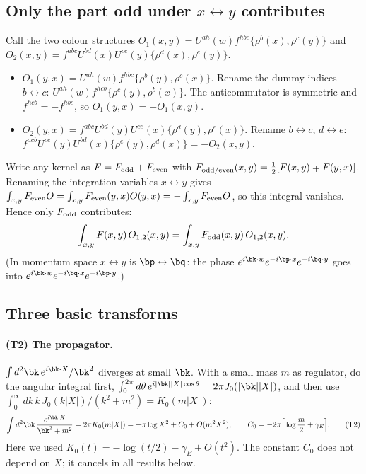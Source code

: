 \subsection{Only the part odd under \texorpdfstring{$x\leftrightarrow y$}{x<->y} contributes}\label{sec:ft-odd}
Call the two colour structures $O_1(x,y)=U^{ah}(w)f^{hbc}\{\rho^b(x),\rho^c(y)\}$ and $O_2(x,y)=f^{abc}U^{bd}(x)U^{ce}(y)\{\rho^d(x),\rho^e(y)\}$.
\begin{itemize}
\item $O_1(y,x)=U^{ah}(w)f^{hbc}\{\rho^b(y),\rho^c(x)\}$. Rename the dummy indices $b\leftrightarrow c$: $U^{ah}(w)f^{hcb}\{\rho^c(y),\rho^b(x)\}$. The anticommutator is symmetric and $f^{hcb}=-f^{hbc}$, so $O_1(y,x)=-O_1(x,y)$.
\item $O_2(y,x)=f^{abc}U^{bd}(y)U^{ce}(x)\{\rho^d(y),\rho^e(x)\}$. Rename $b\leftrightarrow c$, $d\leftrightarrow e$: $f^{acb}U^{ce}(y)U^{bd}(x)\{\rho^e(y),\rho^d(x)\}=-O_2(x,y)$.
\end{itemize}
Write any kernel as $F=F_{\rm odd}+F_{\rm even}$ with $F_{\rm odd/even}(x,y)=\frac12[F(x,y)\mp F(y,x)]$. Renaming the integration variables $x\leftrightarrow y$ gives $\int_{x,y}F_{\rm even}O=\int_{x,y}F_{\rm even}(y,x)O(y,x)=-\int_{x,y}F_{\rm even}O$, so this integral vanishes. Hence only $F_{\rm odd}$ contributes:
\begin{equation}
\int_{x,y}F(x,y)\,O_{1,2}(x,y)=\int_{x,y}F_{\rm odd}(x,y)\,O_{1,2}(x,y).
\end{equation}
(In momentum space $x\leftrightarrow y$ is $\bp\leftrightarrow\bq$: the phase $e^{i\bk\cdot w}e^{-i\bp\cdot x}e^{-i\bq\cdot y}$ goes into $e^{i\bk\cdot w}e^{-i\bq\cdot x}e^{-i\bp\cdot y}$.)

\subsection{Three basic transforms}\label{sec:ft-basic}
\paragraph{(T2) The propagator.} $\int d^2\bk\,e^{i\bk\cdot X}/\bk^2$ diverges at small $\bk$. With a small mass $m$ as regulator, do the angular integral first, $\int_0^{2\pi}d\theta\,e^{i|\bk||X|\cos\theta}=2\pi J_0(|\bk||X|)$, and then use $\int_0^\infty dk\,k\,J_0(k|X|)/(k^2+m^2)=K_0(m|X|)$:
\begin{equation}
\int d^2\bk\,\frac{e^{i\bk\cdot X}}{\bk^2+m^2}=2\pi K_0(m|X|)=-\pi\log X^2+C_0+O(m^2X^2),\qquad C_0=-2\pi\Big[\log\frac m2+\gamma_E\Big].
\tag{T2}
\end{equation}
Here we used $K_0(t)=-\log(t/2)-\gamma_E+O(t^2)$. The constant $C_0$ does not depend on $X$; it cancels in all results below.
